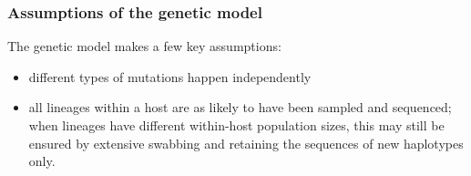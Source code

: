 \documentclass[10pt]{article}
\begin{document}
\subsubsection*{Assumptions of the genetic model}
The genetic model makes a few key assumptions:
\begin{itemize}
 \item different types of mutations happen independently
 \item all lineages within a host are as likely to have been sampled and sequenced; when lineages have different within-host population sizes, this may still be ensured by extensive swabbing and retaining the sequences of new haplotypes only.
\end{itemize}



% 
\end{document}
